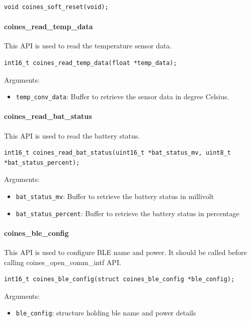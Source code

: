 \begin{lstlisting}
void coines_soft_reset(void);
\end{lstlisting}

\paragraph{coines\_read\_temp\_data}
This API is used to read the temperature sensor data.

\begin{lstlisting}
int16_t coines_read_temp_data(float *temp_data);
\end{lstlisting}
        
Arguments:
\begin{itemize}
	\item \texttt{temp\_conv\_data}: Buffer to retrieve the sensor data in degree Celsius.
\end{itemize}

\paragraph{coines\_read\_bat\_status}
This API is used to read the battery status.

\begin{lstlisting}
int16_t coines_read_bat_status(uint16_t *bat_status_mv, uint8_t *bat_status_percent);
\end{lstlisting}

Arguments:
\begin{itemize}
	\item \texttt{bat\_status\_mv}: Buffer to retrieve the battery status in millivolt
	\item \texttt{bat\_status\_percent}: Buffer to retrieve the battery status in percentage
\end{itemize}

\paragraph{coines\_ble\_config}
This API is used to configure BLE name and power. It should be called before calling coines\_open\_comm\_intf API.

\begin{lstlisting}
int16_t coines_ble_config(struct coines_ble_config *ble_config);
\end{lstlisting}

Arguments:
\begin{itemize}
	\item \texttt{ble\_config}: structure holding ble name and power details
\end{itemize}

